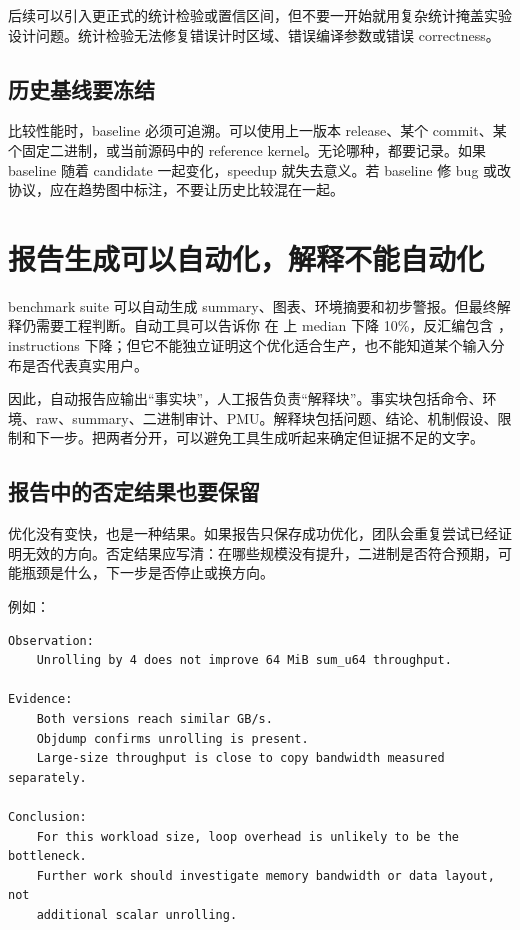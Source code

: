 后续可以引入更正式的统计检验或置信区间，但不要一开始就用复杂统计掩盖实验设计问题。统计检验无法修复错误计时区域、错误编译参数或错误 correctness。

\subsection{历史基线要冻结}

比较性能时，baseline 必须可追溯。可以使用上一版本 release、某个 commit、某个固定二进制，或当前源码中的 reference kernel。无论哪种，都要记录。如果 baseline 随着 candidate 一起变化，speedup 就失去意义。若 baseline 修 bug 或改协议，应在趋势图中标注，不要让历史比较混在一起。

\section{报告生成可以自动化，解释不能自动化}

benchmark suite 可以自动生成 summary、图表、环境摘要和初步警报。但最终解释仍需要工程判断。自动工具可以告诉你  在  上 median 下降 10\%，反汇编包含 ， instructions 下降；但它不能独立证明这个优化适合生产，也不能知道某个输入分布是否代表真实用户。

因此，自动报告应输出“事实块”，人工报告负责“解释块”。事实块包括命令、环境、raw、summary、二进制审计、PMU。解释块包括问题、结论、机制假设、限制和下一步。把两者分开，可以避免工具生成听起来确定但证据不足的文字。

\subsection{报告中的否定结果也要保留}

优化没有变快，也是一种结果。如果报告只保存成功优化，团队会重复尝试已经证明无效的方向。否定结果应写清：在哪些规模没有提升，二进制是否符合预期，可能瓶颈是什么，下一步是否停止或换方向。

例如：

\begin{lstlisting}
Observation:
    Unrolling by 4 does not improve 64 MiB sum_u64 throughput.

Evidence:
    Both versions reach similar GB/s.
    Objdump confirms unrolling is present.
    Large-size throughput is close to copy bandwidth measured separately.

Conclusion:
    For this workload size, loop overhead is unlikely to be the bottleneck.
    Further work should investigate memory bandwidth or data layout, not
    additional scalar unrolling.
\end{lstlisting}

